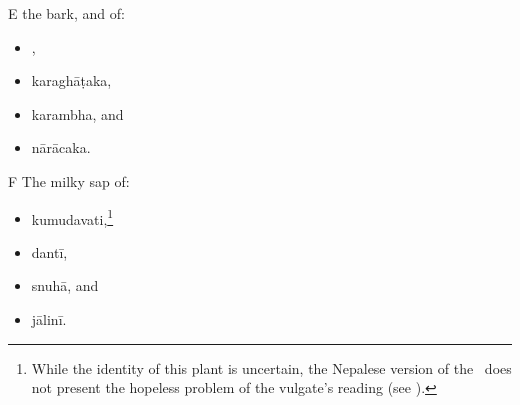 \begin{translation}
        \item[E]
        the bark,  and  of:
\begin{itemize}
        \item {},
        \item \gls{karaghāṭaka},
        \item \gls{karambha},
        and
        \item \gls{nārācaka}.
            \end{itemize}
 
        \item[F]
        The  milky sap of:
              \begin{itemize}
            
        \item \gls{kumudavati},\footnote{While the identity of this plant is 
            uncertain, the Nepalese version of the \SS\ does not present the 
            hopeless problem of the vulgate's reading  (see 
            \cite[140, n.\,100]{wuja-2003}).}
%
\item \gls{dantī},
\item \gls{snuhā},
and
\item \gls{jālinī}.
            \end{itemize}


\end{translation}
